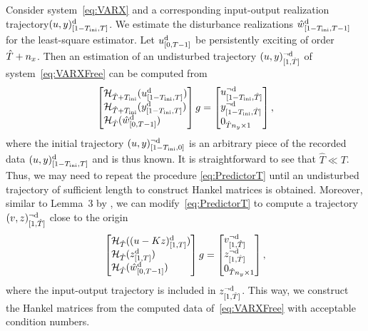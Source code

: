 Consider system~\eqref{eq:VARX} and a corresponding input-output realization trajectory$(u,y)_{[1-T_\text{ini},T]}^{\mathrm{d}}$. We estimate the disturbance realizations $\hat{w}_{[1-T_\text{ini},T-1]}^{\mathrm{d}}$ for the least-square estimator.
Let $u_{[0,T-1]}^{\mathrm{d}}$ be persistently exciting of order $\hat{T}+{n_x}$. Then an estimation of an undisturbed trajectory $(u,y)_{[1,\hat{T}]}^{\neg\mathrm{d}}$ of system~\eqref{eq:VARXFree} can be computed from
\begin{equation}\label{eq:PredictorT}
\begin{bmatrix*}[l] \Hankel_{\hat{T}+\tini}(\trad{u}{1-\tini}{T}) \\ \Hankel_{\hat{T}+\tini}(\trad{y}{1-\tini}{T}) \\ \Hankel_{\hat{T}}(\trad{\hat{w}}{0}{T-1}) \end{bmatrix*} g = \begin{bmatrix*}[l] \traud{u}{1-\tini}{\hat{T}} \\ \traud{y}{1-\tini}{\hat{T}} \\ 0_{\hat{T}n_y\times1} \end{bmatrix*},
\end{equation}
where the initial trajectory $(u,y)_{[1-T_\text{ini},0]}^{\neg\mathrm{d}}$ is an arbitrary piece of the recorded data $(u,y)_{[1-T_\text{ini},T]}^{\mathrm{d}}$ and is thus known. It is straightforward to see that $\hat{T}\ll T$. Thus, we may need to repeat the procedure \eqref{eq:PredictorT} until an undisturbed trajectory of sufficient length to construct Hankel matrices is obtained.
Moreover, similar to Lemma~3 by \citet{kerz23data}, we can modify~\eqref{eq:PredictorT} to compute a trajectory $(v,z)_{[1,\hat{T}]}^{\neg\mathrm{d}}$ close to the origin
\begin{equation} \label{eq:PredictorModify}
\begin{bmatrix*}[l] \Hankel_{\hat{T}}(\trad{(u-Kz)}{1}{T})  \\ \Hankel_{\hat{T}}(\trad{z}{1}{T}) \\ \Hankel_{\hat{T}}(\trad{\hat{w}}{0}{T-1})  \end{bmatrix*} g = \begin{bmatrix*}[l]
	\traud{v}{1}{\hat{T}} \\ \traud{z}{1}{\hat{T}} \\ 0_{\hat{T}n_y\times 1} \end{bmatrix*},
\end{equation}
where the input-output trajectory is included in $z_{[1,\hat{T}]}^{\neg\mathrm{d}}$. This way, we construct the Hankel matrices from the computed data of~\eqref{eq:VARXFree} with acceptable condition numbers.

